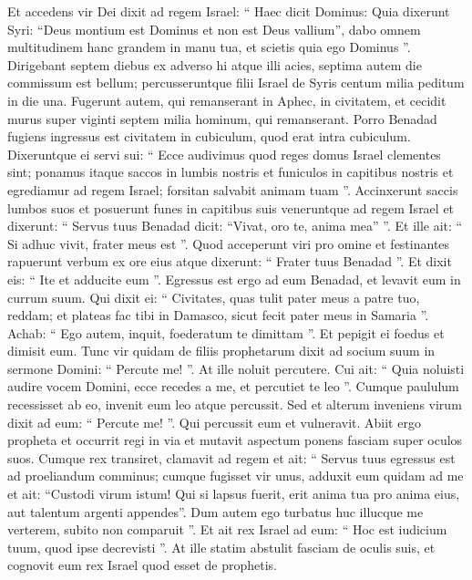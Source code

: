 \begin{biblechapter}
\begin{biblechapter}
\begin{biblechapter}
\begin{biblechapter}
\begin{biblechapter}
\begin{biblechapter}
\begin{biblechapter}
\begin{biblechapter}
\begin{biblechapter}
\begin{biblechapter}
\begin{biblechapter}
\begin{biblechapter}
\begin{biblechapter}
\begin{biblechapter}
\begin{biblechapter}
\begin{biblechapter}
\begin{biblechapter}
\begin{biblechapter}
\begin{biblechapter}
\begin{biblechapter}
 \verse Et accedens vir Dei dixit ad regem Israel: “ Haec dicit Dominus: Quia dixerunt Syri: “Deus montium est Dominus et non est Deus vallium”, dabo omnem multitudinem hanc grandem in manu tua, et scietis quia ego Dominus ”. 
\verse Dirigebant septem diebus ex adverso hi atque illi acies, septima autem die commissum est bellum; percusseruntque filii Israel de Syris centum milia peditum in die una. 
\verse Fugerunt autem, qui remanserant in Aphec, in civitatem, et cecidit murus super viginti septem milia hominum, qui remanserant.
 Porro Benadad fugiens ingressus est civitatem in cubiculum, quod erat intra cubiculum. 
\verse Dixeruntque ei servi sui: “ Ecce audivimus quod reges domus Israel clementes sint; ponamus itaque saccos in lumbis nostris et funiculos in capitibus nostris et egrediamur ad regem Israel; forsitan salvabit animam tuam ”. 
\verse Accinxerunt saccis lumbos suos et posuerunt funes in capitibus suis veneruntque ad regem Israel et dixerunt: “ Servus tuus Benadad dicit: “Vivat, oro te, anima mea” ”. Et ille ait: “ Si adhuc vivit, frater meus est ”. 
\verse Quod acceperunt viri pro omine et festinantes rapuerunt verbum ex ore eius atque dixerunt: “ Frater tuus Benadad ”. Et dixit eis: “ Ite et adducite eum ”. Egressus est ergo ad eum Benadad, et levavit eum in currum suum. 
\verse Qui dixit ei: “ Civitates, quas tulit pater meus a patre tuo, reddam; et plateas fac tibi in Damasco, sicut fecit pater meus in Samaria ”. Achab: “ Ego autem, inquit, foederatum te dimittam ”. Et pepigit ei foedus et dimisit eum.
 \verse Tunc vir quidam de filiis prophetarum dixit ad socium suum in sermone Domini: “ Percute me! ”. At ille noluit percutere. 
\verse Cui ait: “ Quia noluisti audire vocem Domini, ecce recedes a me, et percutiet te leo ”. Cumque paululum recessisset ab eo, invenit eum leo atque percussit. 
\verse Sed et alterum inveniens virum dixit ad eum: “ Percute me! ”. Qui percussit eum et vulneravit. 
 \verse Abiit ergo propheta et occurrit regi in via et mutavit aspectum ponens fasciam super oculos suos. 
\verse Cumque rex transiret, clamavit ad regem et ait: “ Servus tuus egressus est ad proeliandum comminus; cumque fugisset vir unus, adduxit eum quidam ad me et ait: “Custodi virum istum! Qui si lapsus fuerit, erit anima tua pro anima eius, aut talentum argenti appendes”. 
\verse Dum autem ego turbatus huc illucque me verterem, subito non comparuit ”. Et ait rex Israel ad eum: “ Hoc est iudicium tuum, quod ipse decrevisti ”. 
\verse At ille statim abstulit fasciam de oculis suis, et cognovit eum rex Israel quod esset de prophetis. 

\end{biblechapter}
\end{biblechapter}
\end{biblechapter}
\end{biblechapter}
\end{biblechapter}
\end{biblechapter}
\end{biblechapter}
\end{biblechapter}
\end{biblechapter}
\end{biblechapter}
\end{biblechapter}
\end{biblechapter}
\end{biblechapter}
\end{biblechapter}
\end{biblechapter}
\end{biblechapter}
\end{biblechapter}
\end{biblechapter}
\end{biblechapter}
\end{biblechapter}
